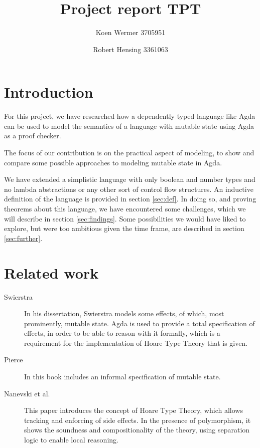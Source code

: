 \documentclass{article}
\author{Koen Wermer 3705951 \and Robert Hensing 3361063}
\title{Project report TPT}
\newcommand{\sectionref}[1]{section \ref{sec:#1}}
\begin{document}
\maketitle

\tableofcontents


%

\section{Introduction}

For this project, we have researched how a dependently typed language
like Agda can be used to model the semantics of a language with
mutable state using Agda as a proof checker.

The focus of our contribution is on the practical aspect of modeling,
to show and compare some possible approaches to modeling mutable state
in Agda.

We have extended a simplistic language with only boolean and number
types and no lambda abstractions or any other sort of control flow
structures.
An inductive definition of the language is provided in
\sectionref{def}.
In doing so, and proving theorems about this language, we have
encountered some challenges, which we will describe in
\sectionref{findings}.
Some possibilities we would have liked to explore, but were too
ambitious given the time frame, are described in \sectionref{further}.

\section{Related work}

\begin{description}
\item[Swierstra]\hfill

In his dissertation, Swierstra models some effects, of which, most prominently, mutable state. Agda is used to provide a total specification of effects, in order to be able to reason with it formally, which is a requirement for the implementation of Hoare Type Theory that is given.

\item[Pierce]\hfill

In this book includes an informal specification of mutable state.

\item[Nanevski et al.]\hfill

This paper introduces the concept of Hoare Type Theory, which allows tracking and enforcing of side effects. In the presence of polymorphism, it shows the soundness and compositionality of the theory, using separation logic to enable local reasoning.

\end{description}
\end{document}
